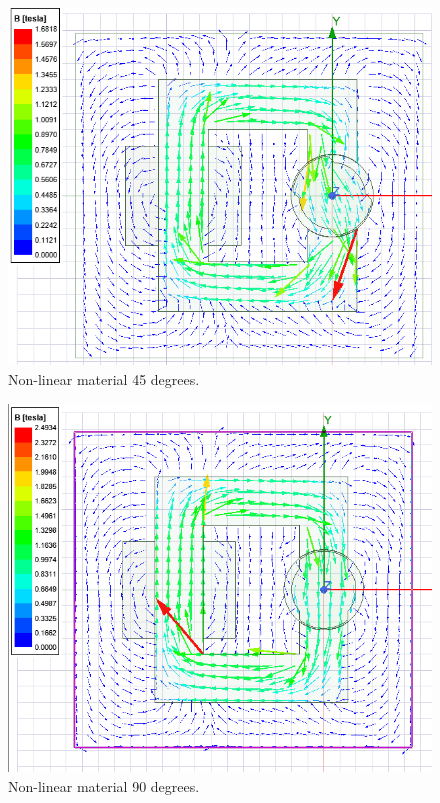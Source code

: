 \documentclass{article}
\begin{document}
\begin{figure}[H]
	\centering
	\includegraphics[width=1\linewidth]{Figurler/Q3/45deg}
	\caption{Non-linear material 45 degrees.}
	\label{fig:45deg}
\end{figure}
\begin{figure}[H]
	\centering
	\includegraphics[width=1\linewidth]{Figurler/Q3/90deg}
	\caption{Non-linear material 90 degrees.}
	\label{fig:90deg}
\end{figure}
\end{document}
